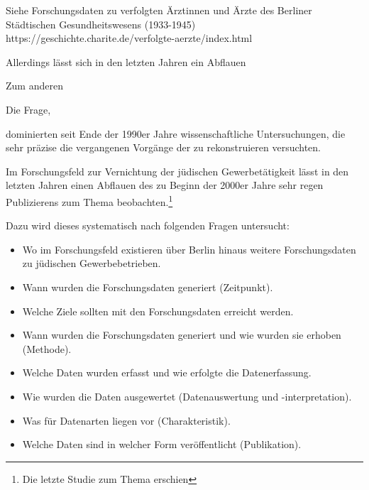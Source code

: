 Siehe Forschungsdaten zu verfolgten Ärztinnen und Ärzte des Berliner Städtischen Gesundheitswesens (1933-1945)
https://geschichte.charite.de/verfolgte-aerzte/index.html


Allerdings lässt sich in den letzten Jahren ein Abflauen

Zum anderen

Die Frage, 

 dominierten seit Ende der 1990er Jahre wissenschaftliche Untersuchungen, die sehr präzise die vergangenen Vorgänge der zu rekonstruieren versuchten.      


Im Forschungsfeld zur Vernichtung der jüdischen Gewerbetätigkeit lässt in den letzten Jahren einen Abflauen des zu Beginn der 2000er Jahre sehr regen Publizierens zum Thema beobachten.\footnote{Die letzte Studie zum Thema erschien}


Dazu wird dieses systematisch nach folgenden Fragen untersucht:

\begin{itemize}
\item Wo im Forschungsfeld existieren über Berlin hinaus weitere Forschungsdaten zu jüdischen Gewerbebetrieben.
\item Wann wurden die Forschungsdaten generiert (Zeitpunkt).
\item Welche Ziele sollten mit den Forschungsdaten erreicht werden.
\item Wann wurden die Forschungsdaten generiert und wie wurden sie erhoben (Methode). 
\item Welche Daten wurden erfasst und wie erfolgte die Datenerfassung.
\item Wie wurden die Daten ausgewertet (Datenauswertung und -interpretation).
\item Was für Datenarten liegen vor (Charakteristik).
\item Welche Daten sind in welcher Form veröffentlicht (Publikation).
\end{itemize}


